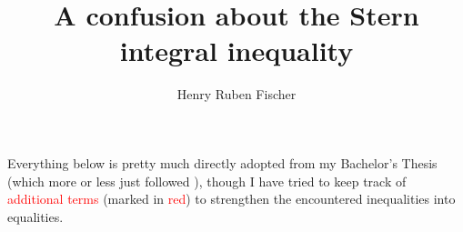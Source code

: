 \documentclass[titlepage,numbers=noenddot,oneside,%
cleardoublepage=empty,paper=a4,fontsize=11pt,%
english,%
]{scrartcl}
\title{A confusion about the Stern integral inequality}
\author{Henry Ruben Fischer}
\begin{document}
\theoremstyle{plain}
\makeatletter
\begin{center}

    \textsc{\LARGE \@title}
    
    
    \large{\@author}
\end{center}
\makeatother
\newcommand{\nonHarmonic}[1]{\textcolor{blue}{#1}}
\newcommand{\additionalTerms}[1]{\textcolor{red}{#1}}
Everything below is pretty much directly adopted from my Bachelor's Thesis (which more or less just followed \cite{brayHarmonicFunctionsMass2019}), though I have tried to keep track of \additionalTerms{additional terms} (marked in \additionalTerms{red}) to strengthen the encountered inequalities into equalities.
\end{document}
